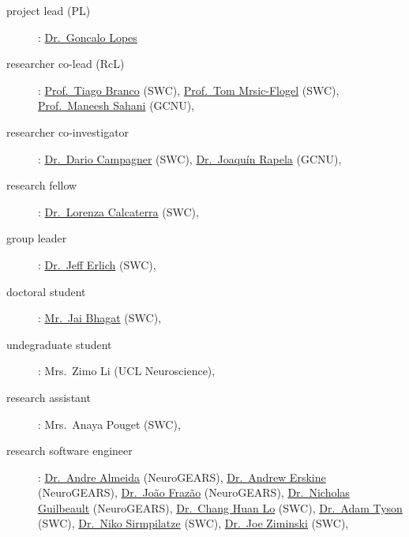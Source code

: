 
\begin{description}
    \item[project lead (PL)]:
    \href{https://neurogears.org/about-us/}{Dr.~Goncalo Lopes}

    \item[researcher co-lead (RcL)]:
        \href{https://www.sainsburywellcome.org/web/people/tiago-branco}{Prof.~Tiago Branco} (SWC),
        \href{https://www.sainsburywellcome.org/web/people/tom-mrsic-flogel}{Prof.~Tom Mrsic-Flogel} (SWC), 
        \href{https://www.gatsby.ucl.ac.uk/~maneesh/}{Prof.~Maneesh Sahani} (GCNU), 

    \item[researcher co-investigator]:
        \href{https://www.sainsburywellcome.org/web/people/dario-campagner}{Dr.~Dario Campagner} (SWC),
        \href{http://www.gatsby.ucl.ac.uk/~rapela/index.html}{Dr.~Joaqu\'{i}n Rapela} (GCNU),

    \item[research fellow]:
        \href{https://www.sainsburywellcome.org/web/people/lorenza-calcaterra-0}{Dr.~Lorenza Calcaterra} (SWC),

    \item[group leader]:
        \href{https://www.sainsburywellcome.org/web/people/jeffrey-erlich}{Dr.~Jeff Erlich} (SWC),

    \item[doctoral student]:
        \href{https://www.sainsburywellcome.org/web/people/jai-bhagat}{Mr.~Jai Bhagat} (SWC),

    \item[undegraduate student]:
        Mrs.~Zimo Li (UCL Neuroscience),

    \item[research assistant]:
        Mrs.~Anaya Pouget (SWC),

    \item[research software engineer]:
        \href{https://neurogears.org/about-us/}{Dr.~Andre Almeida} (NeuroGEARS), 
        \href{https://neurogears.org/about-us/}{Dr.~Andrew Erskine} (NeuroGEARS), 
        \href{https://neurogears.org/about-us/}{Dr.~Jo\~{a}o Fraz\~{a}o} (NeuroGEARS), 
        \href{https://neurogears.org/about-us/}{Dr.~Nicholas Guilbeault} (NeuroGEARS), 
        \href{https://www.sainsburywellcome.org/web/people/chang-huan-lo}{Dr.~Chang Huan Lo} (SWC), 
        \href{https://www.sainsburywellcome.org/web/people/adam-tyson-0}{Dr.~Adam Tyson} (SWC), 
        \href{https://www.sainsburywellcome.org/web/people/niko-sirmpilatze}{Dr.~Niko Sirmpilatze} (SWC), 
        \href{https://www.sainsburywellcome.org/web/people/joe-ziminski}{Dr.~Joe Ziminski} (SWC), 


\end{description}
